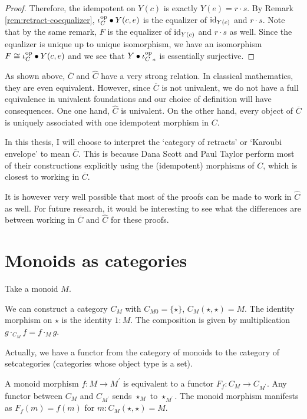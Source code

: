 \begin{proof}
  Therefore, the idempotent on $ Y(c) $ is exactly $ Y(e) = r \cdot s $. By Remark \ref{rem:retract-coequalizer}, $ \iota_C^{\text{op}} \bullet Y(c, e) $ is the equalizer of $ \text{id}_{Y(c)} $ and $ r \cdot s $. Note that by the same remark, $ F $ is the equalizer of $ \text{id}_{Y(c)} $ and $ r \cdot s $ as well. Since the equalizer is unique up to unique isomorphism, we have an isomorphism $ F \cong \iota_C^{\text{op}} \bullet Y(c, e) $ and we see that $ Y \bullet {\ensuremath{\iota_C^{\text{op}}}}_* $ is essentially surjective.
\end{proof}

\begin{remark}
  As shown above, $ \overline C $ and $ \hat C $ have a very strong relation. In classical mathematics, they are even equivalent. However, since $ \overline C $ is not univalent, we do not have a full equivalence in univalent foundations and our choice of definition will have consequences. One one hand, $ \hat C $ is univalent. On the other hand, every object of $ \overline C $ is uniquely associated with one idempotent morphism in $ C $.

  In this thesis, I will choose to interpret the `category of retracts' or `Karoubi envelope' to mean $ \overline C $. This is because Dana Scott and Paul Taylor perform most of their constructions explicitly using the (idempotent) morphisms of $ C $, which is closest to working in $ \overline C $.

  It is however very well possible that most of the proofs can be made to work in $ \hat C $ as well. For future research, it would be interesting to see what the differences are between working in $ \overline C $ and $ \hat C $ for these proofs.
\end{remark}

\section{Monoids as categories}\label{sec:monoid-category}
Take a monoid $ M $.
\begin{definition}
  We can construct a category $ C_M $ with $ C_{M0} = \{ \star \} $, $ C_M(\star, \star) = M $. The identity morphism on $ \star $ is the identity $ 1: M $. The composition is given by multiplication $ g \cdot_{C_M} f = f \cdot_M g $.
\end{definition}

\begin{remark}
  Actually, we have a functor from the category of monoids to the category of setcategories (categories whose object type is a set).

  A monoid morphism $ f: M \to M^\prime $ is equivalent to a functor $ F_f: C_M \to C_{M^\prime} $. Any functor between $ C_M $ and $ C_{M^\prime} $ sends $ \star_M $ to $ \star_{M^\prime} $. The monoid morphism manifests as $ F_f(m) = f(m) $ for $ m: C_M(\star, \star) = M $.
\end{remark}

